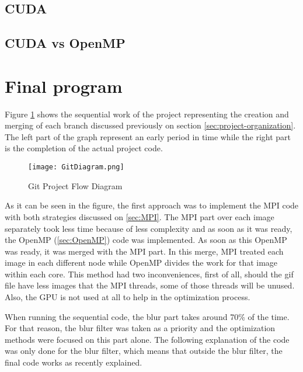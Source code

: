 \documentclass[conference,compsoc]{IEEEtran}
\begin{document}
\subsection{CUDA}\label{sec:CUDA}

\subsection{CUDA vs OpenMP}


\section{Final program}

Figure \ref{fig:Git-Project-Flow-Diagram} shows the sequential work of the project representing the creation and merging of each branch discussed previously on section \ref{sec:project-organization}. The left part of the graph represent an early period in time while the right part is the completion of the actual project code.

\begin{figure}[H]
	\texttt{[image: GitDiagram.png]}	\centering
	\caption{Git Project Flow Diagram	\label{fig:Git-Project-Flow-Diagram}}
\end{figure}

As it can be seen in the figure, the first approach was to implement the MPI code with both strategies discussed on \ref{sec:MPI}. The MPI part over each image separately took less time because of less complexity and as soon as it was ready, the OpenMP (\ref{sec:OpenMP}) code was implemented. As soon as this OpenMP was ready, it was merged with the MPI part. In this merge, MPI treated each image in each different node while OpenMP divides the work for that image within each core. This method had two inconveniences, first of all, should the gif file have less images that the MPI threads, some of those threads will be unused. Also, the GPU is not used at all to help in the optimization process.

When running the sequential code, the blur part takes around 70\% of the time. For that reason, the blur filter was taken as a priority and the optimization methods were focused on this part alone. The following explanation of the code was only done for the blur filter, which means that outside the blur filter, the final code works as recently explained.
\end{document}
